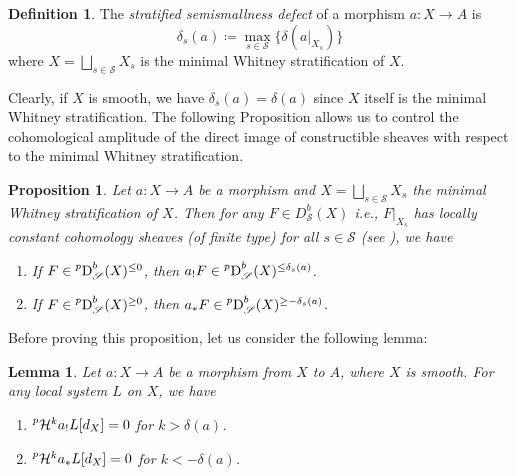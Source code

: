 \documentclass[11pt]{amsart}
\newtheorem{lemma}[equation]{Lemma}
\newtheorem{proposition}[equation]{Proposition}
\theoremstyle{definition}
\newtheorem{definition}[equation]{Definition}
\theoremstyle{plain}
\renewcommand{\H}{\mathcal H}
\newcommand{\sS}{\mathscr S}
\DeclareMathOperator{\Dp}{\prescript{p}{}{D}}
\begin{document}
\begin{definition} \label{definition: stratified semismall defect}
    The \textit{stratified semismallness defect} of a morphism $a: X\to A$ is 
    \[\delta_s(a) \coloneqq \max_{s\in \sS} \{\delta(a|_{X_s})\}\]
    where $X = \bigsqcup_{s\in \sS} X_s$ is the minimal Whitney stratification of $X$. 
\end{definition}

Clearly, if $X$ is smooth, we have $\delta_s(a) = \delta(a)$ since $X$ itself is the minimal Whitney stratification. The following Proposition allows us to control the cohomological amplitude of the direct image of constructible sheaves with respect to the minimal  Whitney stratification. 

\begin{proposition} \label{proposition: stratified semismall defect bound}
    Let $a: X\to A$ be a morphism and $X = \bigsqcup_{s\in \sS} X_s$ the minimal Whitney stratification of $X$. Then for any $F\in D^b_{\sS}(X)$ i.e., $F|_{X_s}$ has locally constant cohomology sheaves (of finite type) for all $s\in \sS$ (see \cite[Definition 2.3.7]{Achar-pervers-sheaves}), we have 
    \begin{enumerate}
        \item If $F\in \Dp^b_{\sS}(X)^{\le 0}$, then $a_! F \in \Dp^b_{\sS}(X)^{\le \delta_s(a)}$.
        \item If $F\in \Dp^b_{\sS}(X)^{\ge 0}$, then $a_* F \in \Dp^b_{\sS}(X)^{\ge -\delta_s(a)}$.
    \end{enumerate}
\end{proposition}

Before proving this proposition, let us consider the following lemma:

\begin{lemma} \label{lemma: coh amp of image of loc sys}
    Let $a:X \to A$ be a morphism from $X$ to $A$, where $X$ is smooth. For any local system $L$ on $X$, we have
    \begin{enumerate}
        \item $\prescript{p}{}{\H}^k a_! L[d_X] = 0$ for $k > \delta(a)$.
        \item $\prescript{p}{}{\H}^k a_* L[d_X] = 0$ for $k < -\delta(a)$.
    \end{enumerate}
\end{lemma}
\end{document}

